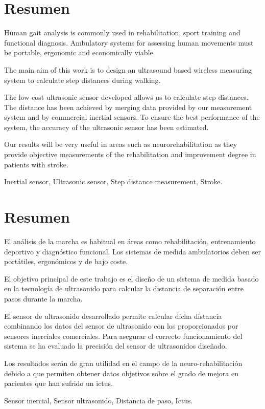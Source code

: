 \chapter*{Resumen}

\begin{abstractEn} 
Human gait analysis is commonly used in rehabilitation, sport training and functional diagnosis. Ambulatory systems for assessing human movements must be portable, ergonomic and economically viable. 

The main aim of this work is to design an ultrasound based wireless measuring system to calculate step distances during walking.

The low-cost ultrasonic sensor developed allows us to calculate step distances. The distance has been achieved by merging data provided by our measurement system and by commercial inertial sensors. To ensure the best performance of the system, the accuracy of the ultrasonic sensor has been estimated.

Our results will be very useful in areas such as neurorehabilitation as they provide objective measurements of the rehabilitation and improvement degree in patients with stroke.



\end{abstractEn}

\begin{keywordsEn}
Inertial sensor, Ultrasonic sensor, Step distance measurement, Stroke.
\end{keywordsEn}

\chapter*{Resumen}

\begin{abstractEs}
 El análisis de la marcha es habitual en áreas como rehabilitación, entrenamiento deportivo y diagnóstico funcional. Los sistemas de medida ambulatorios deben ser portátiles, ergonómicos y de bajo coste.
 
 El objetivo principal de este trabajo es el diseño de un sistema de medida basado en la tecnología de ultrasonido para calcular la distancia de separación entre pasos durante la marcha.
 
 El sensor de ultrasonido desarrollado permite calcular dicha distancia combinando los datos del sensor de ultrasonido con los proporcionados por sensores inerciales comerciales. Para asegurar el correcto funcionamiento del sistema se ha evaluado la precisión del sensor de ultrasonidos diseñado.
 
 Los resultados serán de gran utilidad en el campo de la neuro-rehabilitación debido a que permiten obtener datos objetivos sobre el grado de mejora en pacientes que han sufrido un ictus.



\end{abstractEs}

\begin{keywordsEs}
Sensor inercial, Sensor ultrasonido, Distancia de paso, Ictus.
\end{keywordsEs}
